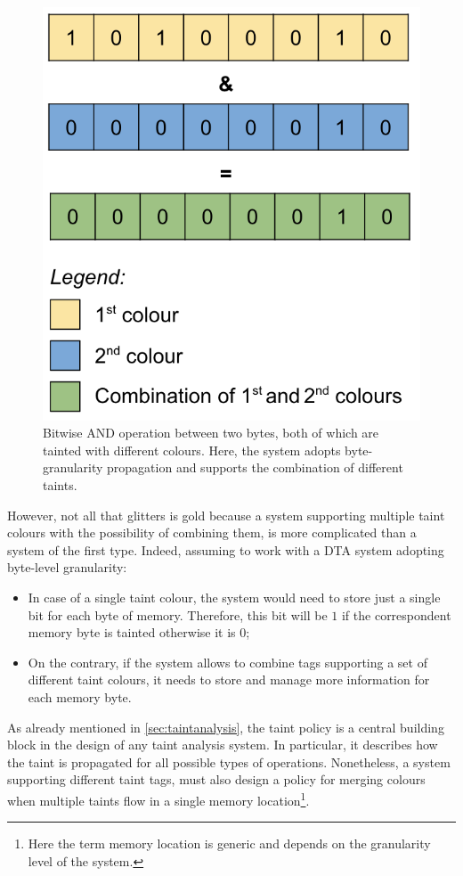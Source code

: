 \documentclass[LaM,binding=0.6cm]{sapthesis}
\begin{document}
\begin{figure}[h!]
\centering
\includegraphics[scale=.5]{images/techn4}
\caption{Bitwise AND operation between two bytes, both of which are tainted with different colours. Here, the system adopts byte-granularity propagation and supports the combination of different taints.}
\end{figure}

\newpage
However, not all that glitters is gold because a system supporting multiple taint colours with the possibility of combining them, is more complicated than a system of the first type. Indeed, assuming to work with a DTA system adopting byte-level granularity:
\begin{itemize}
\item In case of a single taint colour, the system would need to store just a single bit for each byte of memory. Therefore, this bit will be $1$ if the correspondent memory byte is tainted otherwise it is $0$;
\item On the contrary, if the system allows to combine tags supporting a set of different taint colours, it needs to store and manage more information for each memory byte.
\end{itemize}
As already mentioned in \autoref{sec:taintanalysis}, the taint policy is a central building block in the design of any taint analysis system. In particular, it describes how the taint is propagated for all possible types of operations. Nonetheless, a system supporting different taint tags, must also design a policy for merging colours when multiple taints flow in a single memory location\footnote{Here the term memory location is generic and depends on the granularity level of the system.}.
\end{document}
